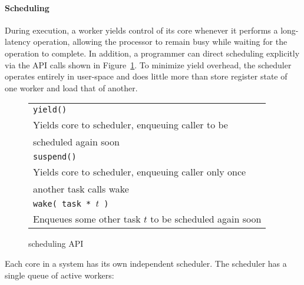 
\paragraph{Scheduling} 
During execution, a worker yields control of its core whenever it performs a
long-latency operation, allowing the processor to remain busy while waiting
for the operation to complete. In addition, a programmer can direct scheduling
explicitly via the \Grappa API calls shown in Figure~\ref{fig:scheduling}. To
minimize yield overhead, the \Grappa scheduler operates entirely in user-space
and does little more than store register state of one worker and load that of
another.

\begin{figure}[htbp]
  \begin{center}
	\begin{tabular}{l}
    \texttt{\scriptsize yield() } \\
      Yields core to scheduler, enqueuing caller to be \\ scheduled again soon \\
    \texttt{\scriptsize suspend() }  \\
      Yields core to scheduler, enqueuing caller only once \\ another task calls wake \\
    \texttt{\scriptsize wake( task * $t$ ) } \\
      Enqueues some other task $t$ to be scheduled again soon \\
	\end{tabular}
    \begin{minipage}{0.95\columnwidth}
      \caption{\label{fig:scheduling} \Grappa scheduling API } 
    \end{minipage}
  \end{center}
\end{figure}

Each core in a \Grappa system has its own independent scheduler.  The scheduler has a single queue of active workers:

